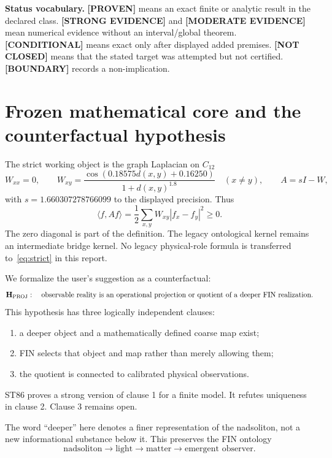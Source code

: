 \documentclass[11pt,a4paper]{article}
\newcommand{\proven}{\textcolor{green!40!black}{\textbf{[PROVEN]}}}
\newcommand{\strong}{\textcolor{blue!70!black}{\textbf{[STRONG EVIDENCE]}}}
\newcommand{\moderate}{\textcolor{cyan!45!black}{\textbf{[MODERATE EVIDENCE]}}}
\newcommand{\conditional}{\textcolor{violet!65!black}{\textbf{[CONDITIONAL]}}}
\newcommand{\blocked}{\textcolor{red!72!black}{\textbf{[NOT CLOSED]}}}
\newcommand{\statusboundary}{\textcolor{orange!80!black}{\textbf{[BOUNDARY]}}}
\begin{document}
\textbf{Status vocabulary.} \proven{} means an exact finite or analytic result in the declared class. \strong{} and \moderate{} mean numerical evidence without an interval/global theorem. \conditional{} means exact only after displayed added premises. \blocked{} means that the stated target was attempted but not certified. \statusboundary{} records a non-implication.

\tableofcontents
\newpage

\section{Frozen mathematical core and the counterfactual hypothesis}

The strict working object is the graph Laplacian on $C_{12}$
\begin{equation}
W_{xx}=0,\qquad
W_{xy}=\frac{\cos(0.18575d(x,y)+0.16250)}{1+d(x,y)^{1.8}}\quad(x\ne y),
\qquad A=sI-W,
\label{eq:strict}
\end{equation}
with $s=1.660307278766099$ to the displayed precision. Thus
\[
\langle f,Af\rangle=\frac12\sum_{x,y}W_{xy}|f_x-f_y|^2\ge0.
\]
The zero diagonal is part of the definition. The legacy ontological kernel remains an intermediate bridge kernel. No legacy physical-role formula is transferred to~\eqref{eq:strict} in this report.

We formalize the user's suggestion as a counterfactual:
\begin{equation}
\mathbf H_{\rm PROJ}:\quad
\text{observable reality is an operational projection or quotient of a deeper FIN realization.}
\end{equation}
This hypothesis has three logically independent clauses:
\begin{enumerate}
\item a deeper object and a mathematically defined coarse map exist;
\item FIN selects that object and map rather than merely allowing them;
\item the quotient is connected to calibrated physical observations.
\end{enumerate}
ST86 proves a strong version of clause 1 for a finite model. It refutes uniqueness in clause 2. Clause 3 remains open.

The word ``deeper'' here denotes a finer representation of the nadsoliton, not a new informational substance below it. This preserves the FIN ontology
\[
\text{nadsoliton}\longrightarrow\text{light}\longrightarrow\text{matter}\longrightarrow\text{emergent observer}.
\]
\end{document}
